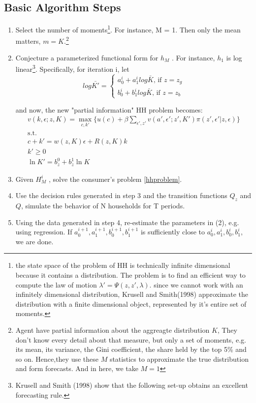 \subsection{{\color{red}Basic Algorithm Steps}}
\begin{enumerate}
\item Select the number of moments\footnote{the state space of the problem of HH is technically infinite dimensional because it contains a distribution. The problem is to find an efficient way to compute the law of motion $\lambda' = \Psi (z,z',\lambda)$. since we cannot work with an infinitely dimensional distribution, Krusell and Smith(1998) approximate the distribution with a finite dimensional object, represented by it's entire set of moments.}. For instance, M = 1. Then only the mean matters, $m = {K}$.\footnote{Agent have partial information about the aggreagte distribution $K$, They don’t know every detail about that measure, but only a set of moments, e.g. its mean, its variance, the Gini coefficient, the share held by the top 5\% and so on. Hence,they use these $M$ statistics to approximate the true distribution and form forecasts. And in here, we take $M=1$}

\item Conjecture a parameterized functional form for $h_M$ . For instance, $h_1$ is log linear\footnote{Krusell and Smith (1998) show that the following set-up obtains an excellent forecasting rule.}. Specifically, for iteration i, let
\[
log \bar{K'} = 
\begin{cases}
a^i_0 + a^i_1 log \bar{K} \text{, if } z = z_g \\
b^i_0 + b^i_1 log \bar{K} \text{, if } z = z_b   
\end{cases}
\]

and now, the new "partial information" HH problem becomes: 
\begin{align}
v(k,\epsilon;z,K)=\max_{c,k'} \{ u(c) + \beta \sum_{\epsilon',z'}v(a',\epsilon';z',K') \pi (z',\epsilon'|z,\epsilon)  \} \\
\text{s.t. } \\
c+k' = w(z,K)\epsilon + R(z,K) k \\
k' \geq 0 \\
\ln K' = b^0_{z} + b^1_z \ln K
\end{align}

\item Given $H^i_M$ , solve the consumer’s problem \ref{hhproblem}. 

\item Use the decision rules generated in step 3 and the transition functions $Q_z$ and $Q$, simulate the behavior of N households for T periods.

\item Using the data generated in step 4, re-estimate the parameters in (2), e.g. using regression. If ${a^{i+1}_0, a^{i+1}_1, b^{i+1}_0, b^{i+1}_1}$ is sufficiently close to ${a^{i}_0, a^{i}_1, b^{i}_0, b^{i}_1}$, we are done.
\end{enumerate}

